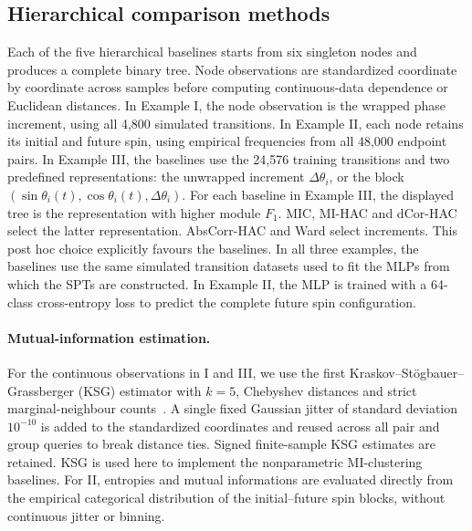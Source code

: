 \documentclass[fleqn,10pt]{wlscirep}
\begin{document}
\subsection{Hierarchical comparison methods}
\label{app:hac}
\label{app:hierarchical_baselines}

Each of the five hierarchical baselines starts from six singleton nodes and produces a complete binary tree. Node observations are standardized coordinate by coordinate across samples before computing continuous-data dependence or Euclidean distances. In Example I, the node observation is the wrapped phase increment, using all 4,800 simulated transitions. In Example II, each node retains its initial and future spin, using empirical frequencies from all 48,000 endpoint pairs. In Example III, the baselines use the 24,576 training transitions and two predefined representations: the unwrapped increment $\Delta\theta_i$, or the block $(\sin\theta_i(t),\cos\theta_i(t),\Delta\theta_i)$. For each baseline in Example III, the displayed tree is the representation with higher module $F_1$. MIC, MI-HAC and dCor-HAC select the latter representation. AbsCorr-HAC and Ward select increments. This post hoc choice explicitly favours the baselines. In all three examples, the baselines use the same simulated transition datasets used to fit the MLPs from which the SPTs are constructed. In Example II, the MLP is trained with a 64-class cross-entropy loss to predict the complete future spin configuration.

\paragraph{Mutual-information estimation.}
For the continuous observations in I and III, we use the first Kraskov--St\"ogbauer--Grassberger (KSG) estimator with $k=5$, Chebyshev distances and strict marginal-neighbour counts~\cite{Kraskov2004EstimatingMI}. A single fixed Gaussian jitter of standard deviation $10^{-10}$ is added to the standardized coordinates and reused across all pair and group queries to break distance ties. Signed finite-sample KSG estimates are retained. KSG is used here to implement the nonparametric MI-clustering baselines. For II, entropies and mutual informations are evaluated directly from the empirical categorical distribution of the initial--future spin blocks, without continuous jitter or binning.
\end{document}
